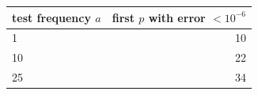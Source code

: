\begin{tabular}{lr}
\toprule
test frequency $a$ & first $p$ with error $<10^{-6}$ \\
\midrule
1 & 10 \\
10 & 22 \\
25 & 34 \\
\bottomrule
\end{tabular}
